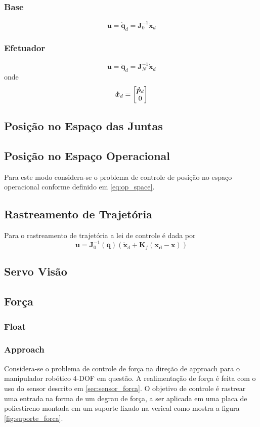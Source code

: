 \subsubsection{Base}
\begin{equation}
\bm{u} = \bm{\dot{q}}_d = \bm{J}_0^{-1} \bm{\dot{x}}_d
\end{equation}
\subsubsection{Efetuador}
\begin{equation}
\bm{u} = \bm{\dot{q}}_d = \bm{J}_N^{-1} \bm{\dot{x}}_d
\end{equation}
onde 
\begin{equation}
\bm{\dot{x}}_d = \begin{bmatrix}\bm{\dot{p}}_d \\ 0\end{bmatrix}
\end{equation}


\subsection{Posição no Espaço das Juntas}


\subsection{Posição no Espaço Operacional}
Para este modo considera-se o problema de controle de posição no espaço operacional conforme definido em \ref{eq:op_space}. 

\subsection{Rastreamento de Trajetória}
Para o rastreamento de trajetória a lei de controle é dada por 
\begin{equation}
\bm{u} = \bm{J}_0^{-1}(\bm{q}) (\dot{\bm{x}}_d + \bm{K}_f (\bm{x_d} - \bm{x}))
\end{equation} 

\subsection{Servo Visão}
\subsection{Força}
\subsubsection{Float}
\subsubsection{Approach}
Considera-se o problema de controle de força na direção de approach para o manipulador robótico 4-DOF em questão. A realimentação de força é feita com o uso do sensor descrito em \ref{sec:sensor_forca}. O objetivo de controle é rastrear uma entrada na forma de um degrau de força, a ser aplicada em uma placa de poliestireno montada em um suporte fixado na verical como mostra a figura \ref{fig:suporte_forca}.  

